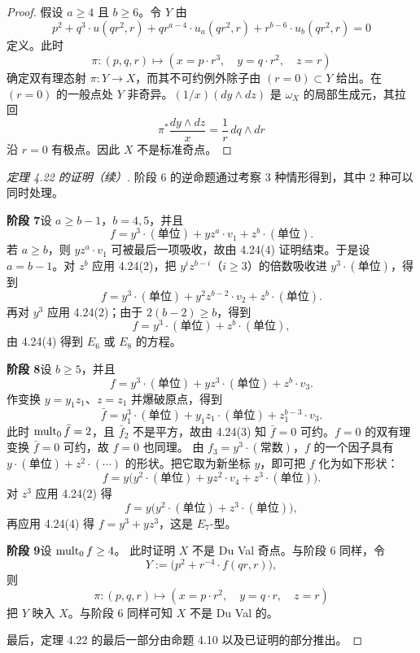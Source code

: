 
\begin{proof}
假设 $a\ge 4$ 且 $b\ge 6$。令 $Y$ 由
\[
p^2+q^3\cdot u(qr^2,r)+qr^{a-4}\cdot u_a(qr^2,r)+r^{b-6}\cdot u_b(qr^2,r)=0
\]
定义。此时
\[
\pi\colon (p,q,r)\mapsto (x=p\cdot r^3,\quad y=q\cdot r^2,\quad z=r)
\]
确定双有理态射 $\pi\colon Y\to X$，而其不可约例外除子由 $(r=0)\subset Y$ 给出。在 $(r=0)$ 的一般点处 $Y$ 非奇异。$(1/x)(dy\wedge dz)$ 是 $\omega_X$ 的局部生成元，其拉回
\[
\pi^*\frac{dy\wedge dz}{x}=\frac1r\,dq\wedge dr
\]
沿 $r=0$ 有极点。因此 $X$ 不是标准奇点。
\end{proof}

\begin{proof}[定理 4.22 的证明（续）]
阶段 6 的逆命题通过考察 3 种情形得到，其中 2 种可以同时处理。

\noindent\textbf{阶段 7}\quad 设 $a\ge b-1$，$b=4,5$，并且
\[
f=y^3\cdot(\text{单位})+yz^a\cdot v_1+z^b\cdot(\text{单位}).
\]
若 $a\ge b$，则 $yz^a\cdot v_1$ 可被最后一项吸收，故由 4.24(4) 证明结束。于是设 $a=b-1$。对 $z^b$ 应用 4.24(2)，把 $y^iz^{b-i}$（$i\ge 3$）的倍数吸收进 $y^3\cdot(\text{单位})$，得到
\[
f=y^3\cdot(\text{单位})+y^2z^{b-2}\cdot v_2+z^b\cdot(\text{单位}).
\]
再对 $y^3$ 应用 4.24(2)；由于 $2(b-2)\ge b$，得到
\[
f=y^3\cdot(\text{单位})+z^b\cdot(\text{单位}),
\]
由 4.24(4) 得到 $E_6$ 或 $E_8$ 的方程。

\noindent\textbf{阶段 8}\quad 设 $b\ge 5$，并且
\[
f=y^3\cdot(\text{单位})+yz^3\cdot(\text{单位})+z^b\cdot v_3 .
\]
作变换 $y=y_1z_1$、$z=z_1$ 并爆破原点，得到
\[
\bar f=y_1^3\cdot(\text{单位})+y_1z_1\cdot(\text{单位})+z_1^{b-3}\cdot v_3 .
\]
此时 $\operatorname{mult}_0\bar f=2$，且 $\bar f_2$ 不是平方，故由 4.24(3) 知 $\bar f=0$ 可约。$f=0$ 的双有理变换 $\bar f=0$ 可约，故 $f=0$ 也同理。
由 $f_3=y^3\cdot(\text{常数})$，$f$ 的一个因子具有 $y\cdot(\text{单位})+z^2\cdot(\cdots)$ 的形状。把它取为新坐标 $y$，即可把 $f$ 化为如下形状：
\[
f=y\bigl(y^2\cdot(\text{单位})+yz^2\cdot v_4+z^3\cdot(\text{单位})\bigr).
\]
对 $z^3$ 应用 4.24(2) 得
\[
f=y\bigl(y^2\cdot(\text{单位})+z^3\cdot(\text{单位})\bigr),
\]
再应用 4.24(4) 得 $f=y^3+yz^3$，这是 $E_7$-型。

\noindent\textbf{阶段 9}\quad 设 $\operatorname{mult}_0f\ge 4$。
此时证明 $X$ 不是 Du Val 奇点。与阶段 6 同样，令
\[
Y:=\bigl(p^2+r^{-4}\cdot f(qr,r)\bigr),
\]
则
\[
\pi\colon (p,q,r)\mapsto (x=p\cdot r^2,\quad y=q\cdot r,\quad z=r)
\]
把 $Y$ 映入 $X$。与阶段 6 同样可知 $X$ 不是 Du Val 的。

最后，定理 4.22 的最后一部分由命题 4.10 以及已证明的部分推出。
\end{proof}

